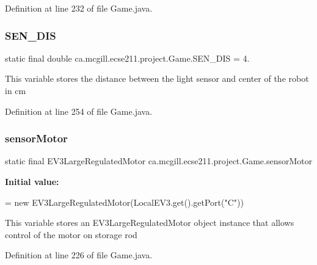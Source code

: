 Definition at line 232 of file Game.\+java.

\mbox{\label{enumca_1_1mcgill_1_1ecse211_1_1project_1_1_game_ab940d1a52b9759294dc0229e0fd6bc06}} 
\subsubsection{\texorpdfstring{S\+E\+N\+\_\+\+D\+IS}{SEN\_DIS}}
{\footnotesize\ttfamily  static  final double ca.\+mcgill.\+ecse211.\+project.\+Game.\+S\+E\+N\+\_\+\+D\+IS = 4.\hspace{0.3cm}{\ttfamily [static]}}

This variable stores the distance between the light sensor and center of the robot in cm 

Definition at line 254 of file Game.\+java.

\mbox{\label{enumca_1_1mcgill_1_1ecse211_1_1project_1_1_game_aa94b85dc88de85d959677bd6c0f98989}} 
\subsubsection{\texorpdfstring{sensor\+Motor}{sensorMotor}}
{\footnotesize\ttfamily  static  final E\+V3\+Large\+Regulated\+Motor ca.\+mcgill.\+ecse211.\+project.\+Game.\+sensor\+Motor\hspace{0.3cm}{\ttfamily [static]}}

{\bfseries Initial value\+:}
\begin{DoxyCode}
=
      \textcolor{keyword}{new} EV3LargeRegulatedMotor(LocalEV3.get().getPort(\textcolor{stringliteral}{"C"}))
\end{DoxyCode}
This variable stores an E\+V3\+Large\+Regulated\+Motor object instance that allows control of the motor on storage rod 

Definition at line 226 of file Game.\+java.

